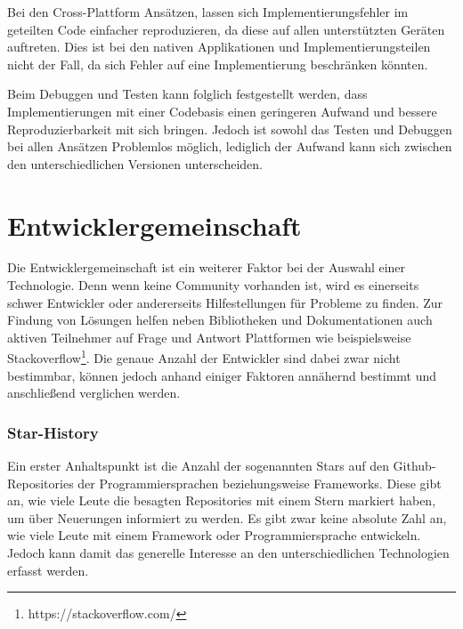 Bei den Cross-Plattform Ansätzen, lassen sich Implementierungsfehler im geteilten Code einfacher reproduzieren, da diese auf allen unterstützten Geräten auftreten. Dies ist bei den nativen Applikationen und Implementierungsteilen nicht der Fall, da sich Fehler auf eine Implementierung beschränken könnten.

Beim Debuggen und Testen kann folglich festgestellt werden, dass Implementierungen mit einer Codebasis einen geringeren Aufwand und bessere Reproduzierbarkeit mit sich bringen. Jedoch ist sowohl das Testen und Debuggen bei allen Ansätzen Problemlos möglich, lediglich der Aufwand kann sich zwischen den unterschiedlichen Versionen unterscheiden.

\section{Entwicklergemeinschaft}
Die Entwicklergemeinschaft ist ein weiterer Faktor bei der Auswahl einer Technologie. Denn wenn keine Community vorhanden ist, wird es einerseits schwer Entwickler oder andererseits Hilfestellungen für Probleme zu finden. Zur Findung von Lösungen helfen neben Bibliotheken und Dokumentationen auch aktiven Teilnehmer auf Frage und Antwort Plattformen wie beispielsweise Stackoverflow\footnote{https://stackoverflow.com/}.
Die genaue Anzahl der Entwickler sind dabei zwar nicht bestimmbar, können jedoch anhand einiger Faktoren annähernd bestimmt und anschließend verglichen werden.

\subsubsection{Star-History}
Ein erster Anhaltspunkt ist die Anzahl der sogenannten Stars auf den Github-Repositories der Programmiersprachen beziehungsweise Frameworks. Diese gibt an, wie viele Leute die besagten Repositories mit einem Stern markiert haben, um über Neuerungen informiert zu werden. Es gibt zwar keine absolute Zahl an, wie viele Leute mit einem Framework oder Programmiersprache entwickeln. Jedoch kann damit das generelle Interesse an den unterschiedlichen Technologien erfasst werden.


